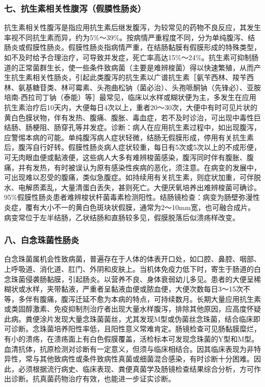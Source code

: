 \subsubsection{七、抗生素相关性腹泻（假膜性肠炎）}

抗生素相关性腹泻是指应用抗生素后继发腹泻，为较常见的药物不良反应，其发生率视不同抗生素而异，约为5\%～39\%。按病情严重程度不同，分为单纯腹泻、结肠炎或假膜性肠炎。假膜性肠炎指病情严重，在结肠黏膜有假膜形成的特殊类型，如不及时给予合理治疗，可导致并发症，死亡率高达15\%～24\%。抗生素可抑制肠道的正常菌群生长，使一些条件致病菌（主要是难辨梭菌）得以快速繁殖，从而产生抗生素相关性肠炎，引起此类腹泻的抗生素以广谱抗生素［氨苄西林、羧苄西林、氨基糖苷类、林可霉素、头孢曲松钠（菌必治）、头孢哌酮钠（先锋必）、亚胺培南-西拉司丁钠（泰能）等］最常见，临床以水样或糊状便为主，多发生在应用抗生素治疗后10天内，大便每日4次以上，重者20～30次，大便中有时可见片状的黄白色膜状物，伴有发热、腹痛、腹胀、毒血症，若不及时诊治，可出现中毒性巨结肠、肠梗阻、肠穿孔等并发症。诊断：病人在应用抗生素过程中，如出现腹泻，应警惕本病的可能。单纯腹泻病人症状轻微，结肠无假膜形成，停用有关抗生素后，腹泻自行好转。假膜性肠炎病人症状较重，每日有5次或5次以上的不成形便，可无肉眼血便或黏液便，这些病人大多有难辨梭菌感染，腹泻同时伴有腹胀、腹痛，并有发热，有时被误认为原有感染性疾病的恶化，须注意。在病变的发展中，可出现难以忍受的腹痛，类似急腹症。如持续用有关抗生素，则症状加重，可伴脱水、电解质紊乱，大量清蛋白丢失，甚则死亡。大便厌氧培养出难辨梭菌可确诊。95\%假膜性肠炎患者难辨梭状杆菌毒素检测阳性。结肠镜检查：病变为肠壁弥漫性炎症，覆有大小不一的黄白色斑块状假膜，通常为2～10mm宽，也可融合成片。病变常位于左半结肠，乙状结肠和直肠较多见，假膜脱落后似溃疡样改变。

\subsubsection{八、白念珠菌性肠炎}

白念珠菌属机会性致病菌，普遍存在于人体的体表开口处，如口腔、鼻腔、咽部、上呼吸道、消化道、肛门、外阴和皮肤上。当机体免疫力低下时，寄生于肠道的白念珠菌侵袭肠黏膜，引起肠炎。以营养不良、身体衰弱幼儿多见。患者的大便呈稀糊状或水样，夹带黏液，严重者呈黏液血便或脓血便，大便次数每日3～15次不等，多伴有腹痛，腹泻迁延不愈为本病的特点，可持续数月。长期大量应用抗生素或类固醇激素、免疫抑制剂治疗者出现大量水样腹泻，排除其他原因，应高度怀疑此病。粪便涂片发现大量念珠菌菌丝，尤其发现M型或伪菌丝念珠菌，结合临床即可诊断。念珠菌培养阳性率低，且阳性意义常难肯定。肠镜检查可见肠黏膜糜烂，有小的溃疡，在溃疡面上有白色假膜覆盖，活检标本可发现念珠菌的Y型和M型。血清抗体，抗原检测对诊断有一定意义，但须与临床相结合。因其临床表现为非特异性，常与其他致病性或条件致病性真菌或细菌混合感染，有时诊断十分困难。因此，必须根据流行病史、临床表现、粪便真菌学及肠镜检查结果综合分析，方可作出诊断。抗真菌药物治疗有效，也能进一步证实诊断。

